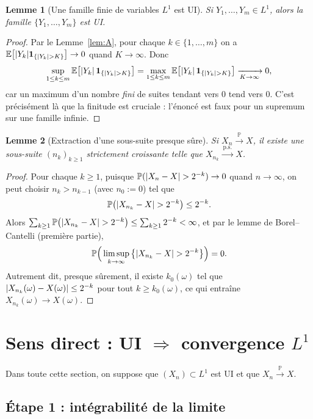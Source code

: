 \documentclass[11pt,a4paper]{article}
\newtheorem{lemma}{Lemme}
\theoremstyle{definition}
\theoremstyle{remark}
\newcommand{\E}{\mathbb{E}}
\newcommand{\PP}{\mathbb{P}}
\newcommand{\ind}[1]{\mathbf{1}_{#1}}
\newcommand{\convP}{\xrightarrow{\ \PP\ }}
\newcommand{\convps}{\xrightarrow{\ \text{p.s.}\ }}
\DeclarePairedDelimiter{\abs}{\lvert}{\rvert}
\begin{document}
\begin{lemma}[Une famille finie de variables $L^1$ est UI]\label{lem:C}
Si $Y_1, \dots, Y_m \in L^1$, alors la famille $\{Y_1, \dots, Y_m\}$ est UI.
\end{lemma}

\begin{proof}
Par le Lemme~\ref{lem:A}, pour chaque $k \in \{1,\dots,m\}$ on a
$\E\big[\abs{Y_k}\ind{\{\abs{Y_k}>K\}}\big] \to 0$ quand $K \to \infty$. Donc
\[
\sup_{1 \le k \le m} \E\big[\abs{Y_k}\,\ind{\{\abs{Y_k} > K\}}\big]
= \max_{1 \le k \le m} \E\big[\abs{Y_k}\,\ind{\{\abs{Y_k} > K\}}\big]
\xrightarrow[K \to \infty]{} 0,
\]
car un maximum d'un nombre \emph{fini} de suites tendant vers $0$ tend vers $0$.
C'est précisément là que la finitude est cruciale : l'énoncé est faux pour un
supremum sur une famille infinie.
\end{proof}

\begin{lemma}[Extraction d'une sous-suite presque sûre]\label{lem:D}
Si $X_n \convP X$, il existe une sous-suite $(n_k)_{k \ge 1}$ strictement
croissante telle que $X_{n_k} \convps X$.
\end{lemma}

\begin{proof}
Pour chaque $k \ge 1$, puisque $\PP(\abs{X_n - X} > 2^{-k}) \to 0$ quand
$n \to \infty$, on peut choisir $n_k > n_{k-1}$ (avec $n_0 := 0$) tel que
\[
\PP\big(\abs{X_{n_k} - X} > 2^{-k}\big) \le 2^{-k}.
\]
Alors $\sum_{k \ge 1} \PP\big(\abs{X_{n_k} - X} > 2^{-k}\big)
\le \sum_{k \ge 1} 2^{-k} < \infty$, et par le lemme de Borel--Cantelli
(première partie),
\[
\PP\Big(\limsup_{k \to \infty} \big\{\abs{X_{n_k} - X} > 2^{-k}\big\}\Big) = 0.
\]
Autrement dit, presque sûrement, il existe $k_0(\omega)$ tel que
$\abs{X_{n_k}(\omega) - X(\omega)} \le 2^{-k}$ pour tout $k \ge k_0(\omega)$,
ce qui entraîne $X_{n_k}(\omega) \to X(\omega)$.
\end{proof}

\section{Sens direct : UI $\Rightarrow$ convergence $L^1$}

Dans toute cette section, on suppose que $(X_n) \subset L^1$ est UI et que
$X_n \convP X$.

\subsection{Étape 1 : intégrabilité de la limite}
\end{document}
